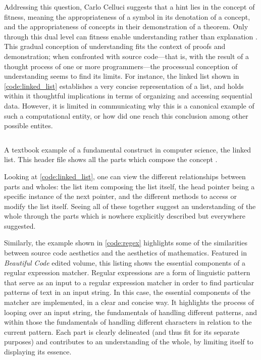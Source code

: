 Addressing this question, Carlo Celluci suggests that a hint lies in the concept of fitness, meaning the appropriateness of a symbol in its denotation of a concept, and the appropriateness of concepts in their demonstration of a theorem. Only through this dual level can fitness enable understanding rather than explanation \citep{cellucci_mathematical_2015}. This gradual conception of understanding fits the context of proofs and demonstration; when confronted with source code—that is, with the result of a thought process of one or more programmers—the processual conception of understanding seems to find its limits. For instance, the linked list shown in \ref{code:linked_list} establishes a very concise representation of a list, and holds within it thoughtful implications in terms of organizing and accessing sequential data. However, it is limited in communicating why this is a canonical example of such a computational entity, or how did one reach this conclusion among other possible entites.

\begin{listing}
    \inputminted{c}{./corpus/linked_list.h}
    \caption{A textbook example of a fundamental construct in computer science, the linked list. This header file shows all the parts which compose the concept \citep{kirchner_linked_2022}.}
    \label{code:linked_list}
\end{listing}

Looking at \ref{code:linked_list}, one can view the different relationships between parts and wholes: the list item composing the list itself, the head pointer being a specific instance of the next pointer, and the different methods to access or modify the list itself. Seeing all of these together suggest an understanding of the whole through the parts which is nowhere explicitly described but everywhere suggested.

Similarly, the example shown in \ref{code:regex} highlights some of the similarities between source code aesthetics and the aesthetics of mathematics. Featured in \emph{Beautiful Code} edited volume, this listing shows the essential components of a regular expression matcher. Regular expressions are a form of linguistic pattern that serve as an input to a regular expression matcher in order to find particular patterns of text in an input string. In this case, the essential components of the matcher are implemented, in a clear and concise way. It highlights the process of looping over an input string, the fundamentals of handling different patterns, and within those the fundamentals of handling different characters in relation to the current pattern. Each part is clearly delineated (and thus fit for its separate purposes) and contributes to an understanding of the whole, by limiting itself to displaying its essence.

